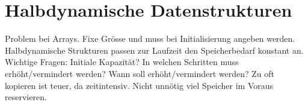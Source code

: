 \section*{Halbdynamische Datenstrukturen}
Problem bei Arrays. Fixe Grösse und muss bei Initialisierung angeben werden. Halbdynamische Strukturen passen zur Laufzeit den Speicherbedarf konstant an. Wichtige Fragen: Initiale Kapazität? In welchen Schritten muss erhöht/vermindert werden? Wann soll erhöht/vermindert werden? Zu oft kopieren ist teuer, da zeitintensiv. Nicht unnötig viel Speicher im Voraus reservieren.